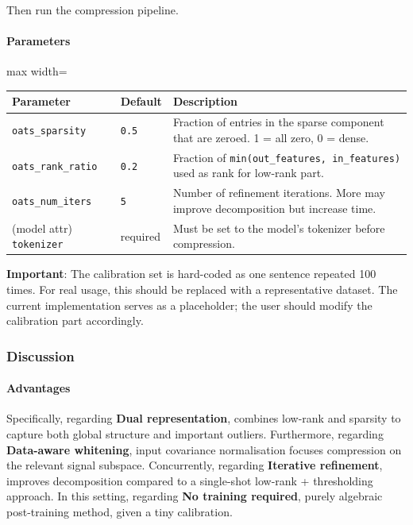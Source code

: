 Then run the compression pipeline.

\paragraph{Parameters}

\begin{center}
\begin{adjustbox}{max width=\columnwidth}
\renewcommand{\arraystretch}{1.2}
\begin{tabular}{lll}
\toprule
Parameter & Default & Description \\
\midrule
\texttt{oats\_sparsity} & \texttt{0.5} & Fraction of entries in the sparse component that are zeroed. 1 = all zero, 0 = dense. \\
\texttt{oats\_rank\_ratio} & \texttt{0.2} & Fraction of \texttt{min(out\_features, in\_features)} used as rank for low-rank part. \\
\texttt{oats\_num\_iters} & \texttt{5} & Number of refinement iterations. More may improve decomposition but increase time. \\
(model attr) \texttt{tokenizer} & required & Must be set to the model's tokenizer before compression. \\

\bottomrule
\end{tabular}
\end{adjustbox}
\end{center}
\textbf{Important}: The calibration set is hard-coded as one sentence repeated 100 times. For real usage, this should be replaced with a representative dataset. The current implementation serves as a placeholder; the user should modify the calibration part accordingly.


\subsubsection*{Discussion}

\paragraph{Advantages}

Specifically, regarding \textbf{Dual representation}, combines low-rank and sparsity to capture both global structure and important outliers. Furthermore, regarding \textbf{Data-aware whitening}, input covariance normalisation focuses compression on the relevant signal subspace. Concurrently, regarding \textbf{Iterative refinement}, improves decomposition compared to a single-shot low-rank + thresholding approach. In this setting, regarding \textbf{No training required}, purely algebraic post-training method, given a tiny calibration.


